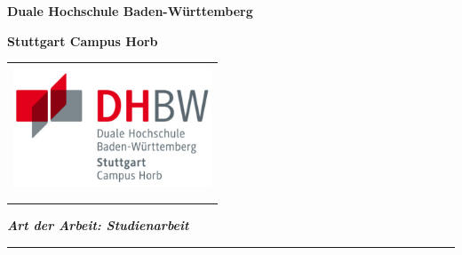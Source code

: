 \titlepage
\begin{center}
    \textbf{\large{}Duale Hochschule Baden-Württemberg }{\large\par}
    \par
\end{center}
\begin{center}
    \textbf{\large{}Stuttgart Campus Horb}{\large\par}
    \par
\end{center}
\begin{center}
    \begin{tabular}{l||r}
        \multicolumn{2}{c}{\vspace{3cm}}
        \tabularnewline
        \multicolumn{2}{c}{\includegraphics[height=3.5cm]{images/dhbwlogo}}
        \tabularnewline
        \multicolumn{2}{c}{}
        \tabularnewline
        \multicolumn{2}{c}{\vspace{59px}}
        \tabularnewline
    \end{tabular}
    \par
\end{center}
\vspace{2cm}

\begin{flushleft}
    \textbf{\Large{}\title{}}{\Large\par}
    \par
\end{flushleft}

\begin{flushleft}
    \textbf{\textit{Art der Arbeit: Studienarbeit}}
    \par
\end{flushleft}

\begin{flushleft}
    {\Large{}\rule[0.5ex]{1\columnwidth}{1pt}}{\Large\par}
    \par
\end{flushleft}

